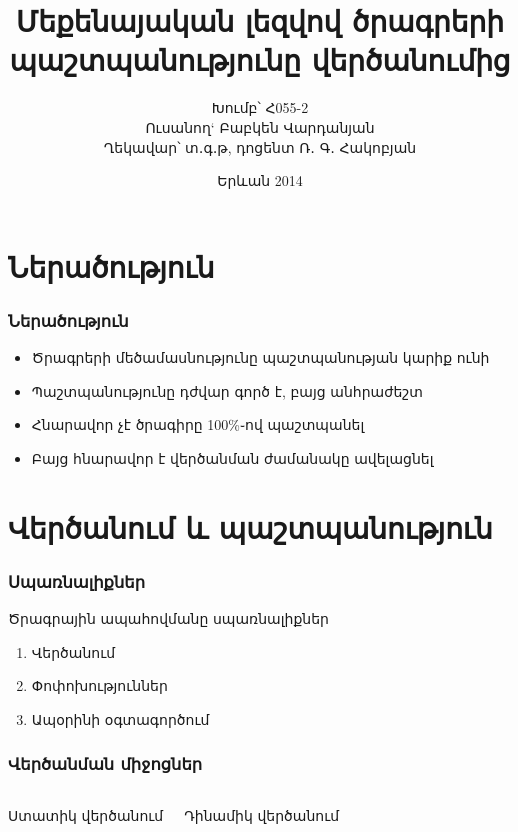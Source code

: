 \documentclass[11pt]{beamer}
\title[Մեքենայական լեզվով ծրագրերի պաշտպանությունը վերծանումից]{Մեքենայական լեզվով ծրագրերի պաշտպանությունը վերծանումից}
\author{Խումբ՝ Հ055-2\\Ուսանող` Բաբկեն Վարդանյան\\Ղեկավար՝ տ․գ․թ, դոցենտ Ռ․ Գ․ Հակոբյան}
\institute[ՀՊՃՀ]{Հայաստանի Պետական Ճարտարագիտական Համալսարան\\Քոմփյութերային Համակարգերի և Ինֆորմատիկայի Ֆակուլտետ}
\date{Երևան 2014}
\begin{document}
\begin{frame}
\titlepage
\end{frame}


\section{Ներածություն}

\begin{frame}\frametitle{Ներածություն}
\begin{itemize}
\item Ծրագրերի մեծամասնությունը պաշտպանության կարիք ունի
\item Պաշտպանությունը դժվար գործ է, բայց անհրաժեշտ
\item Հնարավոր չէ ծրագիրը 100\%֊ով պաշտպանել
\item Բայց հնարավոր է վերծանման ժամանակը ավելացնել
\end{itemize}
\end{frame}

\section{Վերծանում և պաշտպանություն}

\begin{frame}\frametitle{Սպառնալիքներ}
Ծրագրային ապահովմանը սպառնալիքներ
\begin{enumerate}
\item Վերծանում
\item Փոփոխություններ
\item Ապօրինի օգտագործում
\end{enumerate}
\end{frame}

\begin{frame}\frametitle{Վերծանման միջոցներ}
\begin{columns}[t]
\begin{block}{Ստատիկ վերծանում}
\begin{figure}[p]
\centering
\end{figure}
\end{block}
\begin{block}{Դինամիկ վերծանում}
\begin{figure}[p]
\centering
\end{figure}
\end{block}
\end{columns}
\end{frame}
\end{document}
